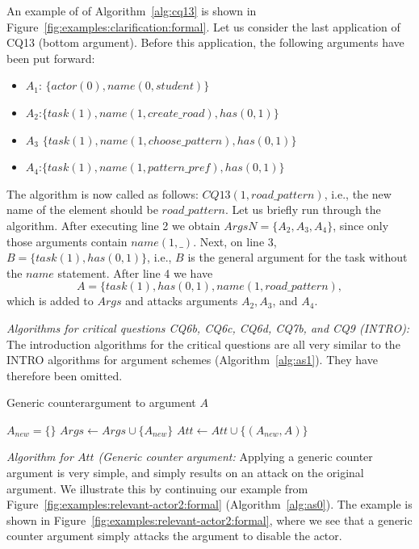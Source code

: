 An example of of Algorithm~\ref{alg:cq13} is shown in Figure~\ref{fig:examples:clarification:formal}. Let us consider the last application of CQ13 (bottom argument). Before this application, the following arguments have been put forward:
\begin{itemize}
\item $A_1$: $\{actor(0),name(0,student)\}$
\item $A_2$:$\{task(1),name(1,create\_road),has(0,1)\}$
\item $A_3$ $\{task(1),name(1,choose\_pattern),has(0,1)\}$
\item $A_4$:$\{task(1),name(1,pattern\_pref),has(0,1)\}$
\end{itemize}
The algorithm is now called as follows: $CQ13(1,road\_pattern)$, i.e., the new name of the element should be $road\_pattern$. Let us briefly run through the algorithm. After executing line 2 we obtain $ArgsN=\{A_2,A_3,A_4\}$, since only those arguments contain $name(1,\_)$. Next, on line 3, $B=\{task(1),has(0,1)\}$, i.e., $B$ is the general argument for the task without the $name$ statement. After line 4 we have $$A=\{task(1),has(0,1),name(1,road\_pattern),$$ which is added to $Args$ and attacks arguments $A_2,A_3$, and $A_4$. 

\emph{Algorithms for critical questions CQ6b, CQ6c, CQ6d, CQ7b, and CQ9 (INTRO):} The introduction algorithms for the critical questions are all very similar to the INTRO algorithms for argument schemes (Algorithm~\ref{alg:as1}). They have therefore been omitted.

\begin{algorithm}[h]
  \caption{Generic counterargument to argument $A$}\label{alg:cq6b}
  \begin{algorithmic}[1]
    \State $A_{new} = \{\}$
    \State $Args \gets Args \cup \{A_{new}\}$
    \State $Att \gets Att \cup \{(A_{new},A)\}$
    \EndProcedure
  \end{algorithmic}
\end{algorithm}

\emph{Algorithm for $Att$ (Generic counter argument:} Applying a generic counter argument is very simple, and simply results on an attack on the original argument. We illustrate this by continuing our example from Figure~\ref{fig:examples:relevant-actor2:formal} (Algorithm~\ref{alg:as0}). The example is shown in Figure~\ref{fig:examples:relevant-actor2:formal}, where we see that a generic counter argument simply attacks the argument to disable the actor.

